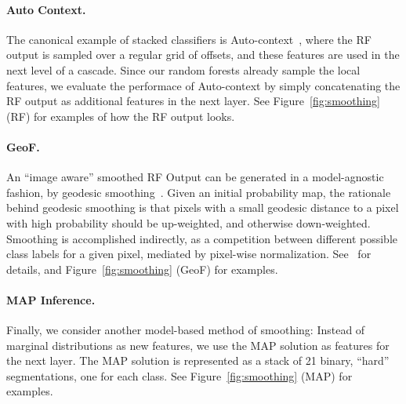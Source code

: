 \documentclass[10pt,twocolumn,letterpaper]{article}
\begin{document}
\paragraph{Auto Context. }
The canonical example of stacked classifiers is Auto-context~\cite{AutoContext2008}, where the RF output is sampled over a regular grid of offsets, and these features are used in the next level of a cascade.  Since our random forests already sample the local features, we evaluate the performace of Auto-context by simply concatenating the RF output as additional features in the next layer.  See Figure~\ref{fig:smoothing} (RF) for examples of how the RF output looks.

\paragraph{GeoF. }
An ``image aware'' smoothed RF Output can be generated in a model-agnostic fashion, by geodesic smoothing~\cite{GeoForests2013}. 
Given an initial probability map, the rationale behind geodesic smoothing is that pixels with a small geodesic distance to a pixel with high probability should be up-weighted, and otherwise down-weighted. Smoothing is accomplished indirectly, as a competition between different possible class labels for a given pixel, mediated by pixel-wise normalization. See~\cite{GeoForests2013} for details, and Figure~\ref{fig:smoothing} (GeoF) for examples.

%
%
%

\paragraph{MAP Inference. }

Finally, we consider another model-based method of smoothing: Instead of marginal distributions as new features, we use the MAP solution
as features for the next layer. The MAP solution is represented as a stack of 21 binary, ``hard'' segmentations, one for each class. 
See Figure~\ref{fig:smoothing} (MAP) for examples.
\end{document}
